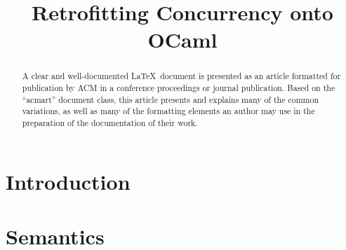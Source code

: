 \documentclass[sigplan,10pt,review,anonymous]{acmart}\settopmatter{printfolios=true,printccs=false,printacmref=false}
\begin{document}
\title{Retrofitting Concurrency onto OCaml}

\begin{abstract}
  A clear and well-documented \LaTeX\ document is presented as an
  article formatted for publication by ACM in a conference proceedings
  or journal publication. Based on the ``acmart'' document class, this
  article presents and explains many of the common variations, as well
  as many of the formatting elements an author may use in the
  preparation of the documentation of their work.
\end{abstract}

\maketitle

\section{Introduction}




\section{Semantics}
\end{document}
